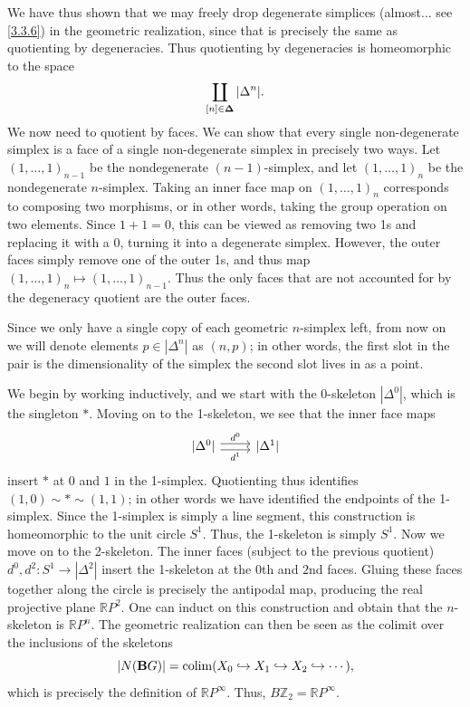 \begin{example}
    We have thus shown that we may freely drop degenerate simplices (almost... see \cref{3.3.6}) in the geometric realization, since that is precisely the same as quotienting by degeneracies. Thus quotienting by degeneracies is homeomorphic to the space
    \[
    \coprod_{[n]\in\boldsymbol{\Delta}}|\Delta^n|.
    \]
    We now need to quotient by faces. We can show that every single non-degenerate simplex is a face of a single non-degenerate simplex in precisely two ways. Let $(1,\ldots,1)_{n-1}$ be the nondegenerate $(n-1)$-simplex, and let $(1,\ldots,1)_n$ be the nondegenerate $n$-simplex. Taking an inner face map on $(1,\ldots,1)_n$ corresponds to composing two morphisms, or in other words, taking the group operation on two elements. Since $1+1=0$, this can be viewed as removing two 1s and replacing it with a 0, turning it into a degenerate simplex. However, the outer faces simply remove one of the outer 1s, and thus map $(1,\ldots,1)_n\mapsto(1,\ldots,1)_{n-1}$. Thus the only faces that are not accounted for by the degeneracy quotient are the outer faces.

    Since we only have a single copy of each geometric $n$-simplex left, from now on we will denote elements $p\in|\Delta^n|$ as $(n,p)$; in other words, the first slot in the pair is the dimensionality of the simplex the second slot lives in as a point.
    
    We begin by working inductively, and we start with the $0$-skeleton $|\Delta^0|$, which is the singleton $*$. Moving on to the 1-skeleton, we see that the inner face maps
    \[\begin{tikzcd}
	{|\Delta^0|} & {|\Delta^1|}
	\arrow["{d^0}", shift left, from=1-1, to=1-2]
	\arrow["{d^1}"', shift right, from=1-1, to=1-2]
\end{tikzcd}\]
    insert $*$ at $0$ and $1$ in the 1-simplex. Quotienting thus identifies $(1,0)\sim *\sim (1,1)$; in other words we have identified the endpoints of the 1-simplex. Since the 1-simplex is simply a line segment, this construction is homeomorphic to the unit circle $S^1$. Thus, the 1-skeleton is simply $S^1$. Now we move on to the 2-skeleton. The inner faces (subject to the previous quotient) $d^0,d^2 : S^1 \to |\Delta^2|$ insert the 1-skeleton at the $0$th and $2$nd faces. Gluing these faces together along the circle is precisely the antipodal map, producing the real projective plane $\mathbb{R}P^2$. One can induct on this construction and obtain that the $n$-skeleton is $\mathbb{R}P^n$. The geometric realization can then be seen as the colimit over the inclusions of the skeletons
    \[
    |N(\mathbf{B}G)| = \operatorname*{colim}(X_0\hookrightarrow X_1\hookrightarrow X_2\hookrightarrow\cdots),
    \]
    which is precisely the definition of $\mathbb{R}P^{\infty}$. Thus, $B\mathbb{Z}_2=\mathbb{R}P^\infty$.
\end{example}

